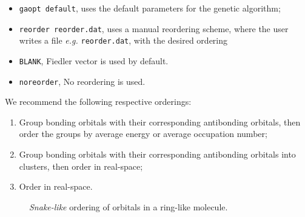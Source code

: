 \documentclass[letterpaper,12pt,aps, pra]{revtex4-1}
\begin{document}
\begin{itemize}
	\item \texttt{gaopt default}, uses the default parameters for the genetic
		algorithm;
	\item \texttt{reorder reorder.dat}, uses a manual reordering scheme,
		where the user writes a file \textit{e.g.} \texttt{reorder.dat}, 
		with the desired ordering
	\item \texttt{BLANK}, Fiedler vector is used by default.
	 \item \texttt{noreorder}, No reordering is used.

\end{itemize}

We recommend the following respective orderings:
\begin{enumerate}
\item Group bonding orbitals with their corresponding antibonding orbitals, then order the groups by average energy or average occupation number;
\item Group bonding orbitals with their corresponding antibonding orbitals into clusters, then order in real-space;
\item Order in real-space.
\end{enumerate}

\begin{figure} \begin{center}  \end{center} \caption{\emph{Snake-like} ordering of orbitals in a ring-like molecule.} \label{fig:order}
 \end{figure}
\end{document}
